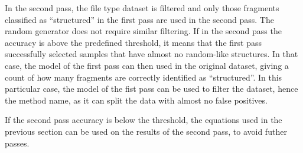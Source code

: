 In the second pass, the file type dataset is filtered and only those fragments classified as ``structured'' in the first pass are used in the second pass. The random generator does not require similar filtering. If in the second pass the accuracy is above the predefined threshold, it means that the first pass successfully selected samples that have almost no random-like structures. In that case, the model of the first pass can then used in the original dataset, giving a count of how many fragments are correctly identified as ``structured''. In this particular case, the model of the fist pass can be used to filter the dataset, hence the method name, as it can split the data with almost no false positives.

If the second pass accuracy is below the threshold, the equations used in the previous section can be used on the results of the second pass, to avoid futher passes.

